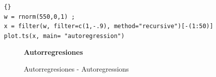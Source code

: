 \begin{lstlisting}[title={‘Código R para generar Autoregresions’},basicstyle=\ttfamily]{}
w = rnorm(550,0,1) ; 
x = filter(w, filter=c(1,-.9), method="recursive")[-(1:50)]
plot.ts(x, main= "autoregression")
\end{lstlisting}\label{autoregression}
\begin{figure}[H]
	\centering
	\textbf{Autorregresiones}\par\medskip
	\caption{Autorregresiones - Autoregressions}\label{figura9}
\end{figure}

